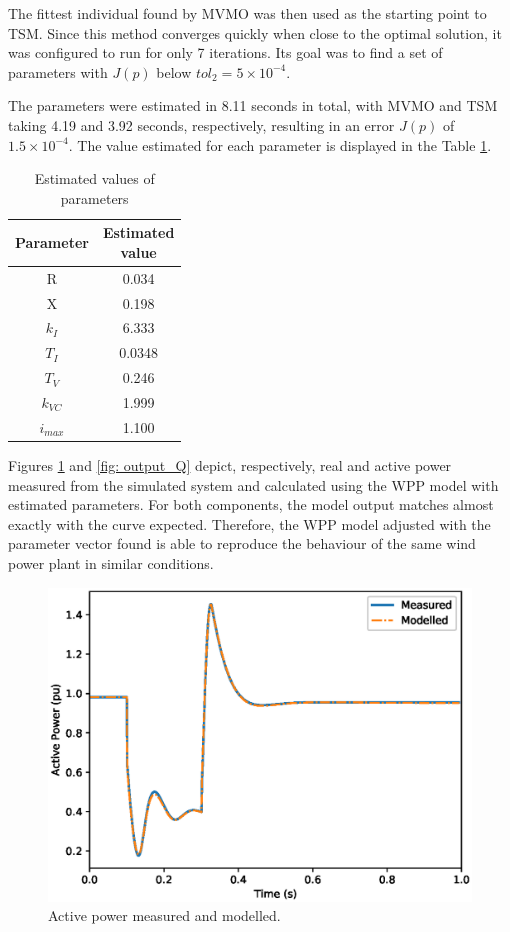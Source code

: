 The fittest individual found by MVMO was then used as the starting point to TSM. Since this method converges quickly when close to the optimal solution, it was configured to run for only 7 iterations. Its goal was to find a set of parameters with $J(p)$ below $tol_{2} = 5\times10^{-4}$.

The parameters were estimated in 8.11 seconds in total, with MVMO and TSM taking 4.19 and 3.92 seconds, respectively, resulting in an error $J(p)$ of $1.5\times 10^{-4}$. The value estimated for each parameter is displayed in the Table \ref{tab: results}.

\begin{table}[h]
	\centering
	\begin{tabular}{c|c}
		Parameter & \shortstack{Estimated \\ value} \\\hline
		R & 0.034 \\
		X & 0.198 \\
		$k_{I}$ & 6.333 \\
		$T_{I}$ & 0.0348 \\
		$T_{V}$ & 0.246 \\
		$k_{VC}$ & 1.999 \\
		$i_{max}$ & 1.100
	\end{tabular}
	\caption{Estimated values of parameters}
	\label{tab: results}
\end{table}

Figures \ref{fig: output_P} and \ref{fig: output_Q} depict, respectively, real and active power measured from the simulated system and calculated using the WPP model with estimated parameters. For both components, the model output matches almost exactly with the curve expected. Therefore, the WPP model adjusted with the parameter vector found is able to reproduce the behaviour of the same wind power plant in similar conditions.

\begin{figure}[h]
	\centering
	\includegraphics[scale=0.7]{Images/P_compared.eps}
	\caption{Active power measured and modelled.}
	\label{fig: output_P}
\end{figure}

